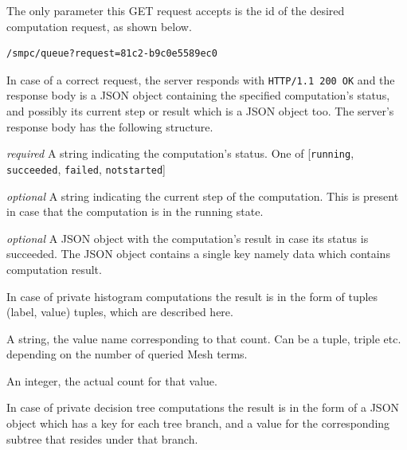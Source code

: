 \begin{description}[labelwidth=5em, leftmargin=\dimexpr\labelwidth+\labelsep\relax]
  \item[Request:] The only parameter this GET request accepts is the id of the desired computation request, as shown below.

\begin{minipage}{\linewidth}
{
\begin{verbatim}
/smpc/queue?request=81c2-b9c0e5589ec0
\end{verbatim}
\label{sc:queue-request}
}
\end{minipage}
  \item[Response:] In case of a correct request, the server responds with \texttt{HTTP/1.1 200 OK} and the response body is a JSON object containing the specified computation's status, and possibly its current step or result which is a JSON object too.
The server's response body has the following structure.
\begin{description}[labelwidth=4em, leftmargin=\dimexpr\labelwidth+\labelsep\relax]
    \item [\texttt{status}:]{\color{red}\textit{required}} A string indicating the computation's status. One of [\texttt{running}, \texttt{succeeded}, \texttt{failed}, \texttt{notstarted}]
    \item [\texttt{step}:]{\color{blue}\textit{optional}} A string indicating the current step of the computation. This is present in case that the computation is in the running state.
    \item [\texttt{result}:]{\color{blue}\textit{optional}} A JSON object with the computation's result in case its status is succeeded. The JSON object contains a single key namely data which contains computation result.

    In case of private histogram computations the result is in the form of tuples (label, value) tuples, which are described here.
    \begin{description}[labelwidth=4em, leftmargin=\dimexpr\labelwidth+\labelsep\relax]
        \item [\texttt{label}:] A string, the value name corresponding to that count. Can be a tuple, triple etc. depending on the number of queried Mesh terms.
        \item [\texttt{value}:] An integer, the actual count for that value.
    \end{description}
    In case of private decision tree computations the result is in the form of a JSON object which has a key for each tree branch, and a value for the corresponding subtree that resides under that branch.
\end{description}


\end{description}
